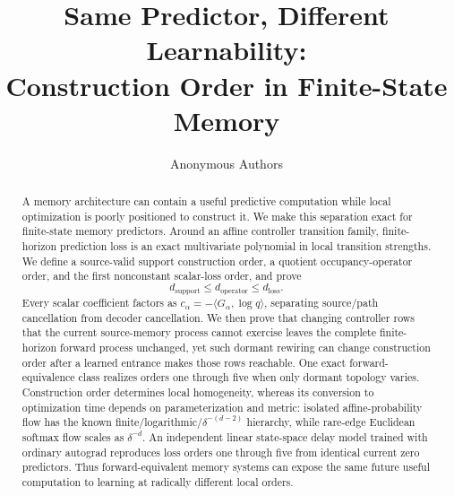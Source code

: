 \documentclass{article}
\title{Same Predictor, Different Learnability:\\Construction Order in Finite-State Memory}
\author{Anonymous Authors}
\newif\ificlrstyle
\newcommand{\dsupport}{d_{\mathrm{support}}}
\newcommand{\doperator}{d_{\mathrm{operator}}}
\newcommand{\dloss}{d_{\mathrm{loss}}}
\begin{document}
\maketitle

\begin{abstract}
A memory architecture can contain a useful predictive computation while local optimization is poorly positioned to construct it. We make this separation exact for finite-state memory predictors. Around an affine controller transition family, finite-horizon prediction loss is an exact multivariate polynomial in local transition strengths. We define a source-valid support construction order, a quotient occupancy-operator order, and the first nonconstant scalar-loss order, and prove
\[
\dsupport\leq\doperator\leq\dloss.
\]
Every scalar coefficient factors as $c_\alpha=-\langle G_\alpha,\log q\rangle$, separating source/path cancellation from decoder cancellation. We then prove that changing controller rows that the current source-memory process cannot exercise leaves the complete finite-horizon forward process unchanged, yet such dormant rewiring can change construction order after a learned entrance makes those rows reachable. One exact forward-equivalence class realizes orders one through five when only dormant topology varies. Construction order determines local homogeneity, whereas its conversion to optimization time depends on parameterization and metric: isolated affine-probability flow has the known finite/logarithmic/$\delta^{-(d-2)}$ hierarchy, while rare-edge Euclidean softmax flow scales as $\delta^{-d}$. An independent linear state-space delay model trained with ordinary autograd reproduces loss orders one through five from identical current zero predictors. Thus forward-equivalent memory systems can expose the same future useful computation to learning at radically different local orders.
\end{abstract}









\FloatBarrier
{}




\clearpage
\ificlrstyle
  
\else
  
\fi


\appendix

\end{document}
